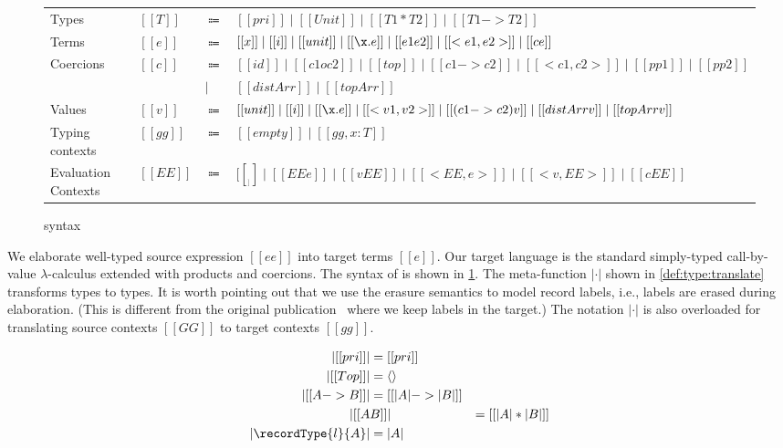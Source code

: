 \begin{figure}[t]
  \centering
\begin{tabular}{llll} \toprule
  Types & $[[T]]$ & $\Coloneqq$ & $[[pri]] \mid [[Unit]] \mid [[T1 * T2]] \mid [[T1 -> T2]] $ \\
  Terms & $[[e]]$ & $\Coloneqq$ & $[[x]] \mid [[i]] \mid [[unit]] \mid [[\x . e]] \mid [[e1 e2]] \mid [[<e1, e2>]] \mid [[c e]]$ \\
  Coercions & $[[c]]$ & $\Coloneqq$ & $ [[id]] \mid [[c1 o c2]] \mid [[top]] \mid [[c1 -> c2]] \mid [[<c1, c2>]] \mid [[pp1]] \mid [[pp2]] $ \\
  &  &  $\mid$ & $   [[distArr]] \mid [[topArr]]  $ \\
  Values & $[[v]]$ & $\Coloneqq$ & $[[unit]] \mid [[i]] \mid [[\x.e]] \mid  [[<v1, v2>]] \mid [[(c1 -> c2) v]] \mid [[distArr v]] \mid [[topArr v]] $ \\
  Typing contexts & $[[gg]]$ & $\Coloneqq$ & $[[empty]] \mid [[gg , x : T]]$ \\
  Evaluation Contexts & $[[EE]]$ & $\Coloneqq$ &  $  [[__]] \mid [[EE e]] \mid [[v EE]] \mid [[ < EE , e >  ]] \mid [[ < v , EE > ]] \mid [[ c EE  ]]$ \\ \bottomrule
\end{tabular}
  \caption{\tname syntax}
  \label{fig:target}
\end{figure}

We elaborate well-typed source expression $[[ee]]$ into target terms $[[e]]$.
Our target language \tname is the standard simply-typed call-by-value
$\lambda$-calculus extended with products and coercions. The syntax of \tname is
shown in \cref{fig:target}. The meta-function $| \cdot |$ shown in
\cref{def:type:translate} transforms \namee types to \tname types. It is worth
pointing out that we use the erasure semantics to model record labels, i.e.,
labels are erased during elaboration. (This is different from the original
publication~\citep{bi_et_al:LIPIcs:2018:9227} where we keep labels in the
target.)
The notation $| \cdot |$ is also overloaded for
translating source contexts $[[GG]]$ to target contexts $[[gg]]$.

\begin{definition} \label{def:type:translate}
  \begin{align*}
    | [[pri]] | &= [[pri]] \\
    | [[Top]] | &= \langle \rangle \\
    | [[A -> B]]  | &= [[ | A | -> | B |  ]] \\
    | [[ A & B  ]] | &= [[ | A | * | B |  ]] \\
    | \recordType{l}{A} | &= | A |
  \end{align*}
\end{definition}



